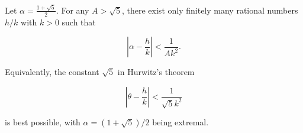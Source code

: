 Let $\alpha = \frac{1 + \sqrt{5}}{2}$. For any $A > \sqrt{5}$, there exist only finitely many rational numbers $h/k$ with $k > 0$ such that

$$\left|\alpha - \frac{h}{k}\right| < \frac{1}{A k^2}.$$

Equivalently, the constant $\sqrt{5}$ in Hurwitz's theorem

$$\left|\theta - \frac{h}{k}\right| < \frac{1}{\sqrt{5} k^2}$$

is best possible, with $\alpha = (1+\sqrt{5})/2$ being extremal.
